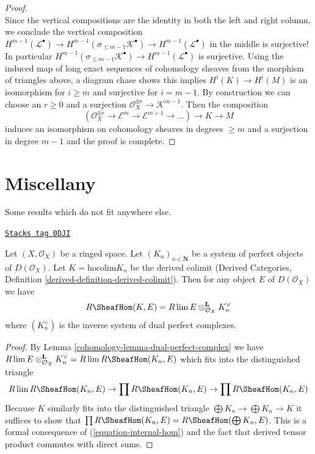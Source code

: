 \begin{proof}
$$$$
Since the vertical compositions are the identity in both the
left and right column, we conclude the vertical composition
$H^{m - 1}(\mathcal{L}^\bullet) \to
H^{m - 1}(\sigma_{\leq m - 1}\mathcal{K}^\bullet) \to
H^{m - 1}(\mathcal{L}^\bullet)$ in the middle is surjective!
In particular $H^{m - 1}(\sigma_{\leq m - 1}\mathcal{K}^\bullet) \to
H^{m - 1}(\mathcal{L}^\bullet)$ is surjective.
Using the induced map of long exact sequences of cohomology
sheaves from the morphism of triangles above, a diagram chase
shows this implies $H^i(K) \to H^i(M)$ is an isomorphism
for $i \geq m$ and surjective for $i = m - 1$.
By construction we can choose an $r \geq 0$ and a surjection
$\mathcal{O}_X^{\oplus r} \to \mathcal{K}^{m - 1}$. Then the
composition
$$
(\mathcal{O}_X^{\oplus r} \to \mathcal{E}^m \to
\mathcal{E}^{m + 1} \to \ldots ) \longrightarrow
K \longrightarrow M
$$
induces an isomorphism on cohomology sheaves in degrees $\geq m$ and
a surjection in degree $m - 1$ and the proof is complete.
\end{proof}

\section{Miscellany}
\label{cohomology-section-misc}
Some results which do not fit anywhere else.

\begin{lemma}
\label{cohomology-lemma-colim-and-lim-of-duals}
\href{https://stacks.math.columbia.edu/tag/0DJI}{\texttt{Stacks tag 0DJI}}

Let $(X, \mathcal{O}_X)$ be a ringed space. Let
$(K_n)_{n \in \mathbf{N}}$ be a system of perfect objects of $D(\mathcal{O}_X)$.
Let $K = \text{hocolim} K_n$ be the derived colimit
(Derived Categories, Definition \ref{derived-definition-derived-colimit}).
Then for any object $E$ of $D(\mathcal{O}_X)$ we have
$$
R\SheafHom(K, E) = R\lim E \otimes^\mathbf{L}_{\mathcal{O}_X} K_n^\vee
$$
where $(K_n^\vee)$ is the inverse system of dual perfect complexes.
\end{lemma}

\begin{proof}

By Lemma \ref{cohomology-lemma-dual-perfect-complex} we have
$R\lim E \otimes^\mathbf{L}_{\mathcal{O}_X} K_n^\vee =
R\lim R\SheafHom(K_n, E)$
which fits into the distinguished triangle
$$
R\lim R\SheafHom(K_n, E) \to
\prod R\SheafHom(K_n, E) \to
\prod R\SheafHom(K_n, E)
$$
Because $K$ similarly fits into the distinguished triangle
$\bigoplus K_n \to \bigoplus K_n \to K$ it suffices to show that
$\prod R\SheafHom(K_n, E) = R\SheafHom(\bigoplus K_n, E)$.
This is a formal consequence of (\ref{equation-internal-hom})
and the fact that derived tensor product commutes with direct sums.
\end{proof}


